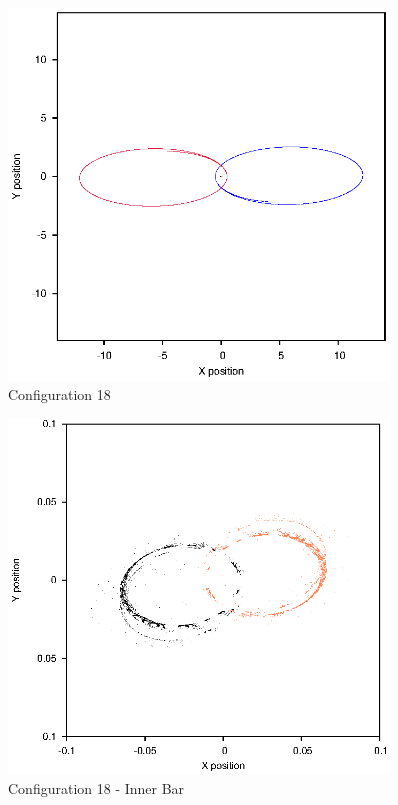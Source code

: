 \documentclass[a4paper,12pt]{article}
\begin{document}
\begin{figure}[H]
\centering
\includegraphics[width=0.9\textwidth]{./results/08-105-08-12/Orbit.eps}
\caption{Configuration 18}
\label{fig:config18}
\end{figure}
\begin{figure}[H]
\centering
\includegraphics[width=0.9\textwidth]{./results/08-105-08-12/Inner.eps}
\caption{Configuration 18 - Inner Bar}
\label{fig:config18i}
\end{figure}
\end{document}
